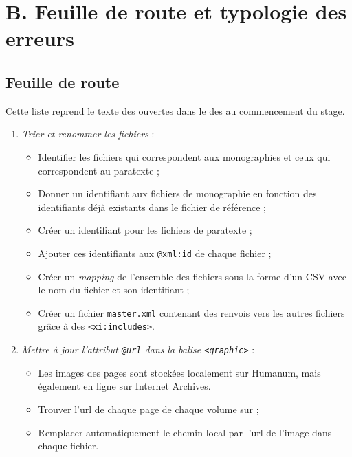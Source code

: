 \renewcommand{\thesection}{B.1}
\chapter{B. Feuille de route et typologie des erreurs}

\section{Feuille de route}
\label{ann:feuille_route}

Cette liste reprend le texte des \issues{} ouvertes dans le \gitlab{} des \odm{} au commencement du stage.

\begin{enumerate}
        \item \textit{Trier et renommer les fichiers} :
    \begin{itemize}
        \item  Identifier les fichiers qui correspondent aux monographies et ceux qui correspondent au paratexte ;
        \item  Donner un identifiant aux fichiers de monographie en fonction des identifiants déjà existants dans le fichier de référence ;
        \item  Créer un identifiant pour les fichiers de paratexte ;
        \item  Ajouter ces identifiants aux \texttt{@xml:id} de chaque fichier ;
        \item  Créer un \textit{mapping} de l’ensemble des fichiers sous la forme d’un CSV avec le nom du fichier et son identifiant ;
        \item  Créer un fichier \texttt{master.xml} contenant des renvois vers les autres fichiers grâce à des \texttt{<xi:includes>}.
    \end{itemize}

    \item \textit{Mettre à jour l’attribut \texttt{@url} dans la balise \texttt{<graphic>}} :
    \begin{itemize}
        \item  Les images des pages sont stockées localement sur Humanum, mais également en ligne sur Internet Archives.
        \item  Trouver l’url de chaque page de chaque volume sur \ia ;
        \item  Remplacer automatiquement le chemin local par l’url de l’image dans chaque fichier.
    \end{itemize}


\end{enumerate}
